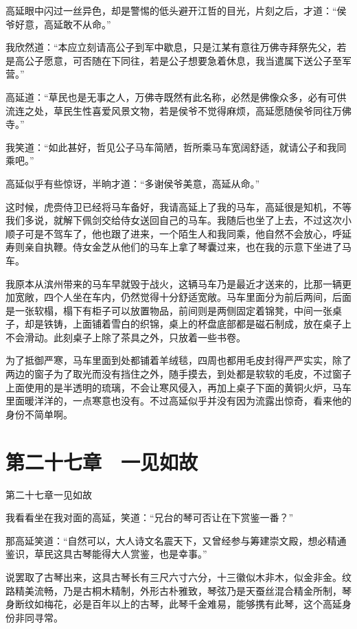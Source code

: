 高延眼中闪过一丝异色，却是警惕的低头避开江哲的目光，片刻之后，才道：“侯爷好意，高延敢不从命。”

我欣然道：“本应立刻请高公子到军中歇息，只是江某有意往万佛寺拜祭先父，若是高公子愿意，可否随在下同往，若是公子想要急着休息，我当遣属下送公子至军营。”

高延道：“草民也是无事之人，万佛寺既然有此名称，必然是佛像众多，必有可供流连之处，草民生性喜爱风景文物，若是侯爷不觉得麻烦，高延愿随侯爷同往万佛寺。”

我笑道：“如此甚好，哲见公子马车简陋，哲所乘马车宽阔舒适，就请公子和我同乘吧。”

高延似乎有些惊讶，半晌才道：“多谢侯爷美意，高延从命。”

这时候，虎赍侍卫已经将马车备好，我请高延上了我的马车，高延很是知机，不等我们多说，就解下佩剑交给侍女送回自己的马车。我随后也坐了上去，不过这次小顺子可是不驾车了，他也跟了进来，一个陌生人和我同乘，他自然不会放心，呼延寿则亲自执鞭。侍女金芝从他们的马车上拿了琴囊过来，也在我的示意下坐进了马车。

我原本从滨州带来的马车早就毁于战火，这辆马车乃是最近才送来的，比那一辆更加宽敞，四个人坐在车内，仍然觉得十分舒适宽敞。马车里面分为前后两间，后面是一张软榻，榻下有柜子可以放置物品，前间则是两侧固定着锦凳，中间一张桌子，却是铁铸，上面铺着雪白的织锦，桌上的杯盘底部都是磁石制成，放在桌子上不会滑动。此刻桌子上除了茶具之外，只放着一些书卷。

为了抵御严寒，马车里面到处都铺着羊绒毯，四周也都用毛皮封得严严实实，除了两边的窗子为了取光而没有挡住之外，随手摸去，到处都是软软的毛皮，不过窗子上面使用的是半透明的琉璃，不会让寒风侵入，再加上桌子下面的黄铜火炉，马车里面暖洋洋的，一点寒意也没有。不过高延似乎并没有因为流露出惊奇，看来他的身份不简单啊。

\chapter{第二十七章　一见如故}

第二十七章一见如故

我看看坐在我对面的高延，笑道：“兄台的琴可否让在下赏鉴一番？”

那高延笑道：“自然可以，大人诗文名震天下，又曾经参与筹建崇文殿，想必精通鉴识，草民这具古琴能得大人赏鉴，也是幸事。”

说罢取了古琴出来，这具古琴长有三尺六寸六分，十三徽似木非木，似金非金。纹路精美流畅，乃是古桐木精制，外形古朴雅致，琴弦乃是天蚕丝混合精金所制，琴身断纹如梅花，必是百年以上的古琴，此琴千金难易，能够携有此琴，这个高延身份非同寻常。

